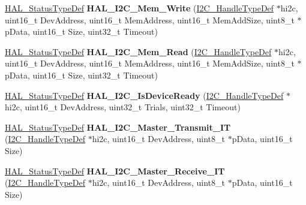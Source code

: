 \begin{DoxyCompactItemize}
\item 
\hyperlink{stm32f4xx__hal__def_8h_a63c0679d1cb8b8c684fbb0632743478f}{H\+A\+L\+\_\+\+Status\+Type\+Def} {\bfseries H\+A\+L\+\_\+\+I2\+C\+\_\+\+Mem\+\_\+\+Write} (\hyperlink{struct_i2_c___handle_type_def}{I2\+C\+\_\+\+Handle\+Type\+Def} $\ast$hi2c, uint16\+\_\+t Dev\+Address, uint16\+\_\+t Mem\+Address, uint16\+\_\+t Mem\+Add\+Size, uint8\+\_\+t $\ast$p\+Data, uint16\+\_\+t Size, uint32\+\_\+t Timeout)\hypertarget{group___i2_c___exported___functions___group2_ga33e725a824eb672f9f999d9d5ce088fb}{}\label{group___i2_c___exported___functions___group2_ga33e725a824eb672f9f999d9d5ce088fb}

\item 
\hyperlink{stm32f4xx__hal__def_8h_a63c0679d1cb8b8c684fbb0632743478f}{H\+A\+L\+\_\+\+Status\+Type\+Def} {\bfseries H\+A\+L\+\_\+\+I2\+C\+\_\+\+Mem\+\_\+\+Read} (\hyperlink{struct_i2_c___handle_type_def}{I2\+C\+\_\+\+Handle\+Type\+Def} $\ast$hi2c, uint16\+\_\+t Dev\+Address, uint16\+\_\+t Mem\+Address, uint16\+\_\+t Mem\+Add\+Size, uint8\+\_\+t $\ast$p\+Data, uint16\+\_\+t Size, uint32\+\_\+t Timeout)\hypertarget{group___i2_c___exported___functions___group2_ga7b593a1b85bd989dd002ee209eae4ad2}{}\label{group___i2_c___exported___functions___group2_ga7b593a1b85bd989dd002ee209eae4ad2}

\item 
\hyperlink{stm32f4xx__hal__def_8h_a63c0679d1cb8b8c684fbb0632743478f}{H\+A\+L\+\_\+\+Status\+Type\+Def} {\bfseries H\+A\+L\+\_\+\+I2\+C\+\_\+\+Is\+Device\+Ready} (\hyperlink{struct_i2_c___handle_type_def}{I2\+C\+\_\+\+Handle\+Type\+Def} $\ast$hi2c, uint16\+\_\+t Dev\+Address, uint32\+\_\+t Trials, uint32\+\_\+t Timeout)\hypertarget{group___i2_c___exported___functions___group2_gade6a669a25f0e99ef7fd52724acb3dec}{}\label{group___i2_c___exported___functions___group2_gade6a669a25f0e99ef7fd52724acb3dec}

\item 
\hyperlink{stm32f4xx__hal__def_8h_a63c0679d1cb8b8c684fbb0632743478f}{H\+A\+L\+\_\+\+Status\+Type\+Def} {\bfseries H\+A\+L\+\_\+\+I2\+C\+\_\+\+Master\+\_\+\+Transmit\+\_\+\+IT} (\hyperlink{struct_i2_c___handle_type_def}{I2\+C\+\_\+\+Handle\+Type\+Def} $\ast$hi2c, uint16\+\_\+t Dev\+Address, uint8\+\_\+t $\ast$p\+Data, uint16\+\_\+t Size)\hypertarget{group___i2_c___exported___functions___group2_ga48b84e0cff0e44d10e10bf9cc5a6726d}{}\label{group___i2_c___exported___functions___group2_ga48b84e0cff0e44d10e10bf9cc5a6726d}

\item 
\hyperlink{stm32f4xx__hal__def_8h_a63c0679d1cb8b8c684fbb0632743478f}{H\+A\+L\+\_\+\+Status\+Type\+Def} {\bfseries H\+A\+L\+\_\+\+I2\+C\+\_\+\+Master\+\_\+\+Receive\+\_\+\+IT} (\hyperlink{struct_i2_c___handle_type_def}{I2\+C\+\_\+\+Handle\+Type\+Def} $\ast$hi2c, uint16\+\_\+t Dev\+Address, uint8\+\_\+t $\ast$p\+Data, uint16\+\_\+t Size)\hypertarget{group___i2_c___exported___functions___group2_ga2aebdb302ffc0a4dff28dc2c8b59e1e9}{}\label{group___i2_c___exported___functions___group2_ga2aebdb302ffc0a4dff28dc2c8b59e1e9}


\end{DoxyCompactItemize}

